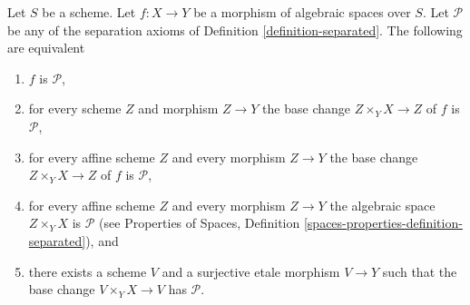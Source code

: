 \begin{lemma}
\label{lemma-characterize-separated}
Let $S$ be a scheme.
Let $f : X \to Y$ be a morphism of algebraic spaces over $S$.
Let $\mathcal{P}$ be any of the separation
axioms of Definition \ref{definition-separated}.
The following are equivalent
\begin{enumerate}
\item $f$ is $\mathcal{P}$,
\item for every scheme $Z$ and morphism $Z \to Y$ the
base change $Z \times_Y X \to Z$ of $f$ is $\mathcal{P}$,
\item for every affine scheme $Z$ and every morphism $Z \to Y$ the
base change $Z \times_Y X \to Z$ of $f$ is $\mathcal{P}$,
\item for every affine scheme $Z$ and every morphism $Z \to Y$ the
algebraic space $Z \times_Y X$ is $\mathcal{P}$ (see
Properties of Spaces, Definition \ref{spaces-properties-definition-separated}),
and
\item there exists a scheme $V$ and a surjective etale morphism
$V \to Y$ such that the base change $V \times_Y X \to V$ has
$\mathcal{P}$.
\end{enumerate}
\end{lemma}

